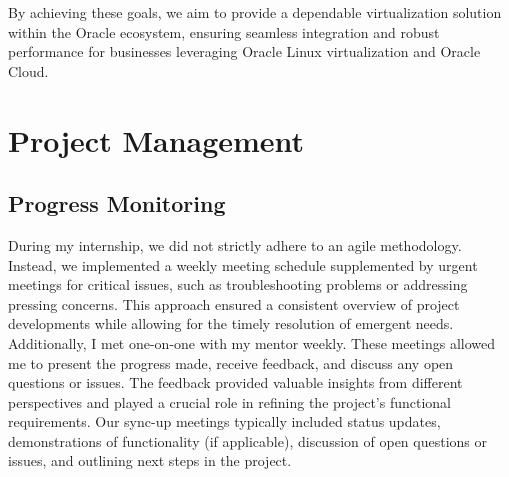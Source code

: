 By achieving these goals, we aim to provide a dependable virtualization solution within the Oracle ecosystem, ensuring seamless integration and robust performance for businesses leveraging Oracle Linux virtualization and Oracle Cloud.

\section{Project Management}

\subsection{Progress Monitoring}
During my internship, we did not strictly adhere to an agile methodology. Instead, we implemented a weekly meeting schedule supplemented by urgent meetings for critical issues, such as troubleshooting problems or addressing pressing concerns. This approach ensured a consistent overview of project developments while allowing for the timely resolution of emergent needs. Additionally, I met one-on-one with my mentor weekly. These meetings allowed me to present the progress made, receive feedback, and discuss any open questions or issues. The feedback provided valuable insights from different perspectives and played a crucial role in refining the project’s functional requirements. Our sync-up meetings typically included status updates, demonstrations of functionality (if applicable), discussion of open questions or issues, and outlining next steps in the project.

